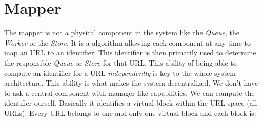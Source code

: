 \section{Mapper}
The mapper is not a physical component in the system like the \emph{Queue}, the \emph{Worker} or the \emph{Store}. It is a algorithm allowing each component at any time to map an URL to an identifier. This identifier is then primarily used to determine the responsible \emph{Queue} or \emph{Store} for that URL.
This ability of being able to compute an identifier for a URL \emph{independently} is key to the whole system architecture. This ability is what makes the system decentralized. We don't have to ask a central component with manager like capabilities. We can compute the identifier ourself. Basically it identifies a virtual block within the URL space (all URLs). Every URL belongs to one and only one virtual block and each block is:
